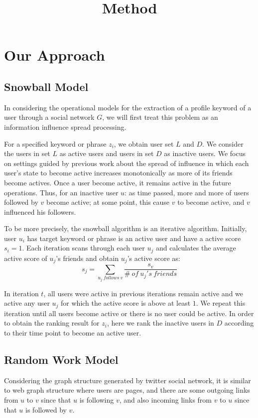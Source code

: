 \documentclass{article}
\begin{document}
\title{Method}
\maketitle \else \fi

\section{Our Approach}\label{sec:method}

\subsection{Snowball Model}
In considering the operational models for the extraction of a profile keyword of a user through a social network $G$, we will first treat this problem as an information influence spread processing.

For a specified keyword or phrase $z_i$, we obtain user set $L$ and $D$. We consider the users in set $L$ as active users and users in set $D$ as inactive users. We focus on settings guided by previous work about the spread of influence in which each user's state to become active increases monotonically as more of its friends become actives. Once a user become active, it remains active in the future operations. Thus, for an inactive user $u$: as time passed, more and more of users followed by $v$ become active; at some point, this cause $v$ to become active, and $v$ influenced his followers.

To be more precisely, the snowball algorithm is an iterative algorithm. Initially, user $u_i$ has target keyword or phrase is an active user and have a active score $s_i=1$. Each iteration scans through each user $u_j$ and calculates the average active score of $u_j$'s friends and obtain $u_j$'s active score as:
$$s_j = \sum_{u_j\ follows\ v} \frac{s_v}{\#\ of\ u_j's\ friends}$$

In iteration $t$, all users were active in previous iterations remain active and we active any user $u_j$ for which the active score is above at least $1$. We repeat this iteration until all users become active or there is no user could be active. In order to obtain the ranking result for $z_i$, here we rank the inactive users in $D$ according to their time point to become an active user.

\subsection{Random Work Model}
Considering the graph structure generated by twitter social network, it is similar to web graph structure where users are pages, and there are some outgoing links from $u$ to $v$ since that $u$ is following $v$, and also incoming links from $v$ to $u$ since that $u$ is followed by $v$.
\end{document}
